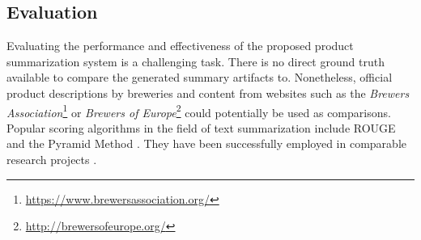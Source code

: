 \subsection{Evaluation}
Evaluating the performance and effectiveness of the proposed product summarization system is a challenging task.
There is no direct ground truth available to compare the generated summary artifacts to.
Nonetheless, official product descriptions by breweries and content from websites such as the \textit{Brewers Association}\footnote{\url{https://www.brewersassociation.org/}} or \textit{Brewers of Europe}\footnote{\url{http://brewersofeurope.org/}} could potentially be used as comparisons.
Popular scoring algorithms in the field of text summarization include ROUGE \cite{Lin2004} and the Pyramid Method \cite{Nenkova2004}.
They have been successfully employed in comparable research projects \cite{Nagwani2015, Ren2013}.
